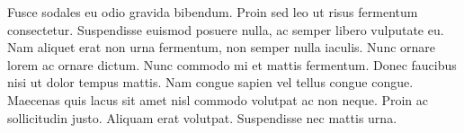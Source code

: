 Fusce sodales eu odio gravida bibendum. Proin sed leo ut risus fermentum consectetur. Suspendisse euismod posuere nulla, ac semper libero vulputate eu. Nam aliquet erat non urna fermentum, non semper nulla iaculis. Nunc ornare lorem ac ornare dictum. Nunc commodo mi et mattis fermentum. Donec faucibus nisi ut dolor tempus mattis. Nam congue sapien vel tellus congue congue. Maecenas quis lacus sit amet nisl commodo volutpat ac non neque. Proin ac sollicitudin justo. Aliquam erat volutpat. Suspendisse nec mattis urna.
